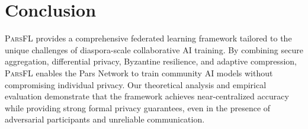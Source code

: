 \documentclass[11pt,a4paper]{article}
\newcommand{\parsfl}{\textsc{ParsFL}\xspace}
\begin{document}
\section{Conclusion}

\parsfl provides a comprehensive federated learning framework tailored to the unique challenges of diaspora-scale collaborative AI training. By combining secure aggregation, differential privacy, Byzantine resilience, and adaptive compression, \parsfl enables the Pars Network to train community AI models without compromising individual privacy. Our theoretical analysis and empirical evaluation demonstrate that the framework achieves near-centralized accuracy while providing strong formal privacy guarantees, even in the presence of adversarial participants and unreliable communication.


\end{document}
